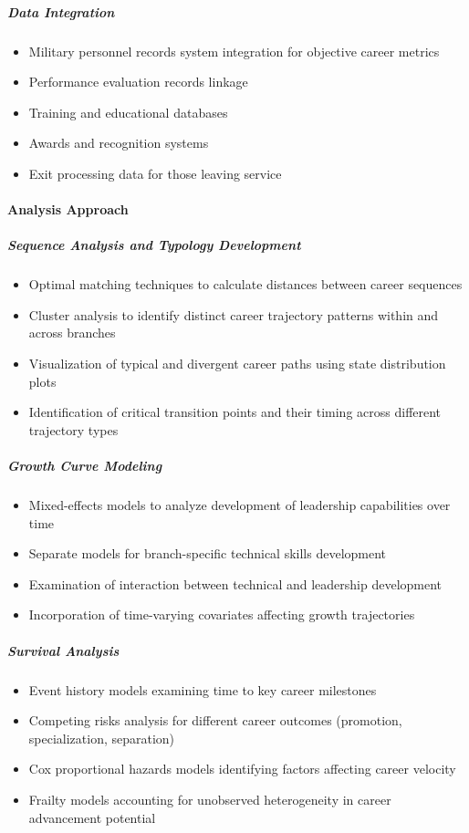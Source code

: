 \documentclass[../main.tex]{subfiles}
\begin{document}
\subparagraph{Data Integration}
\begin{itemize}
\item Military personnel records system integration for objective career metrics
\item Performance evaluation records linkage
\item Training and educational databases
\item Awards and recognition systems
\item Exit processing data for those leaving service
\end{itemize}

\paragraph{Analysis Approach}

\subparagraph{Sequence Analysis and Typology Development}
\begin{itemize}
\item Optimal matching techniques to calculate distances between career sequences \cite{joseph2012career}
\item Cluster analysis to identify distinct career trajectory patterns within and across branches
\item Visualization of typical and divergent career paths using state distribution plots
\item Identification of critical transition points and their timing across different trajectory types
\end{itemize}

\subparagraph{Growth Curve Modeling}
\begin{itemize}
\item Mixed-effects models to analyze development of leadership capabilities over time \cite{lme4slides2011}
\item Separate models for branch-specific technical skills development
\item Examination of interaction between technical and leadership development
\item Incorporation of time-varying covariates affecting growth trajectories
\end{itemize}

\subparagraph{Survival Analysis}
\begin{itemize}
\item Event history models examining time to key career milestones
\item Competing risks analysis for different career outcomes (promotion, specialization, separation)
\item Cox proportional hazards models identifying factors affecting career velocity
\item Frailty models accounting for unobserved heterogeneity in career advancement potential
\end{itemize}
\end{document}
